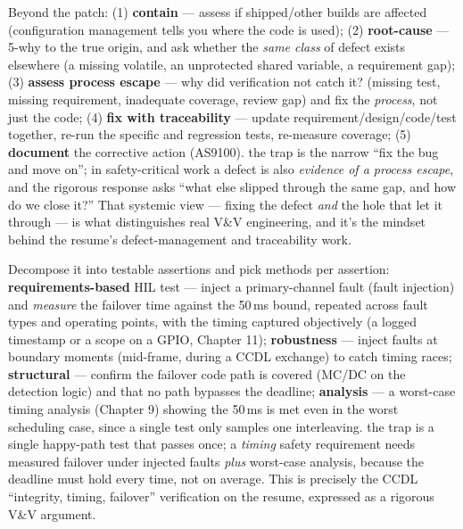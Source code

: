 Beyond the patch: (1) \textbf{contain} --- assess if shipped/other builds are
affected (configuration management tells you where the code is used); (2)
\textbf{root-cause} --- 5-why to the true origin, and ask whether the \emph{same
class} of defect exists elsewhere (a missing volatile, an unprotected shared
variable, a requirement gap); (3) \textbf{assess process escape} --- why did
verification not catch it? (missing test, missing requirement, inadequate
coverage, review gap) and fix the \emph{process}, not just the code; (4)
\textbf{fix with traceability} --- update requirement/design/code/test together,
re-run the specific and regression tests, re-measure coverage; (5)
\textbf{document} the corrective action (AS9100). \trap the trap is the
narrow ``fix the bug and move on''; in safety-critical work a defect is also
\emph{evidence of a process escape}, and the rigorous response asks ``what else
slipped through the same gap, and how do we close it?'' That systemic view ---
fixing the defect \emph{and} the hole that let it through --- is what distinguishes
real V\&V engineering, and it's the mindset behind the resume's defect-management
and traceability work.

Decompose it into testable assertions and pick methods per assertion:
\textbf{requirements-based} HIL test --- inject a primary-channel fault (fault
injection) and \emph{measure} the failover time against the 50\,ms bound,
repeated across fault types and operating points, with the timing captured
objectively (a logged timestamp or a scope on a GPIO, Chapter 11); \textbf{robustness}
--- inject faults at boundary moments (mid-frame, during a CCDL exchange) to catch
timing races; \textbf{structural} --- confirm the failover code path is covered
(MC/DC on the detection logic) and that no path bypasses the deadline;
\textbf{analysis} --- a worst-case timing analysis (Chapter 9) showing the 50\,ms
is met even in the worst scheduling case, since a single test only samples one
interleaving. \trap the trap is a single happy-path test that passes once; a
\emph{timing} safety requirement needs measured failover under injected faults
\emph{plus} worst-case analysis, because the deadline must hold every time, not
on average. This is precisely the CCDL ``integrity, timing, failover''
verification on the resume, expressed as a rigorous V\&V argument.

